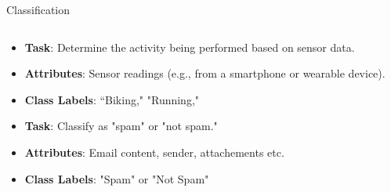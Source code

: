 \documentclass[aspectratio=169]{beamer}
\begin{document}
\begin{frame}{Classification}
\begin{columns}
\begin{column}{0.32\textwidth}
        \begin{coloredblock}
            \begin{itemize}
                \item \scriptsize \textbf{Task}: Determine the activity being performed based on sensor data.
                \item \scriptsize \textbf{Attributes}: Sensor readings (e.g., from a smartphone or wearable device).
                \item \scriptsize \textbf{Class Labels}: “Biking," "Running,"
            \end{itemize}
        \end{coloredblock}
        \vspace{0.1cm}
        \begin{coloredblock}
            \begin{itemize}
                \item \scriptsize \textbf{Task}: Classify as "spam" or "not spam."
                \item \scriptsize \textbf{Attributes}: Email content, sender, attachements etc.
                \item \scriptsize \textbf{Class Labels}: "Spam" or "Not Spam"
            \end{itemize}
        \end{coloredblock}
        
        \end{column}
    \end{columns}

\end{frame}
\end{document}
